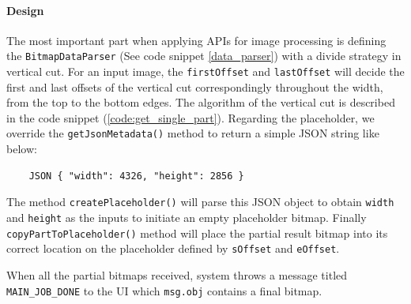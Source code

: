 \documentclass[conference]{IEEEtran}
\begin{document}
\paragraph{Design}
The most important part when applying APIs for image processing is defining the \texttt{BitmapDataParser} (See code snippet \ref{data_parser}) with a divide strategy in vertical cut. For an input image, the \texttt{firstOffset} and \texttt{lastOffset} will decide the first and last offsets of the vertical cut correspondingly throughout the width, from the top to the bottom edges. The algorithm of the vertical cut is described in the code snippet (\ref{code:get_single_part}). Regarding the placeholder, we override the \texttt{getJsonMetadata()} method to return a simple JSON string like below:

	\begin{lstlisting} 
	JSON { "width": 4326, "height": 2856 } 
	\end{lstlisting}

The method \texttt{createPlaceholder()} will parse this JSON object to obtain \texttt{width} and \texttt{height} as the inputs to initiate an empty placeholder bitmap. Finally \texttt{copyPartToPlaceholder()} method will place the partial result bitmap into its correct location on the placeholder defined by \texttt{sOffset} and \texttt{eOffset}.\\

\begin{figure}
\noindent {}
\end{figure}

When all the partial bitmaps received, system throws a message titled \texttt{MAIN\_JOB\_DONE} to the UI which \texttt{msg.obj} contains a final bitmap.
\end{document}
